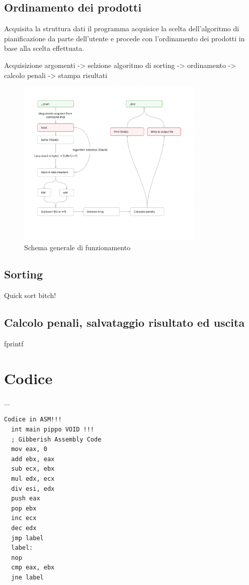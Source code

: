 \documentclass[a4paper]{report}
\begin{document}
\subsection{Ordinamento dei prodotti}
Acquisita la struttura dati il programma acquisice la scelta dell'algoritmo di pianificazione da parte dell'utente e procede con l'ordinamento dei prodotti in base alla scelta effettuata.



Acquisizione argomenti -> selzione algoritmo di sorting -> ordinamento -> calcolo penali -> stampa risultati

\begin{figure}[H]
  \centering
  \includegraphics[width=0.8\textwidth]{schema.png}
  \caption{Schema generale di funzionamento}
  \label{fig:schema}
\end{figure}

\subsection{Sorting}
Quick sort bitch!

\subsection{Calcolo penali, salvataggio risultato ed uscita}
fprintf


\section{Codice}

...  

\begin{lstlisting}[firstnumber=34]
  Codice in ASM!!!
  int main pippo VOID !!!
  ; Gibberish Assembly Code
  mov eax, 0
  add ebx, eax
  sub ecx, ebx
  mul edx, ecx
  div esi, edx
  push eax
  pop ebx
  inc ecx
  dec edx
  jmp label
  label:
  nop
  cmp eax, ebx
  jne label

\end{lstlisting}


\vspace{20pt}
\end{document}
